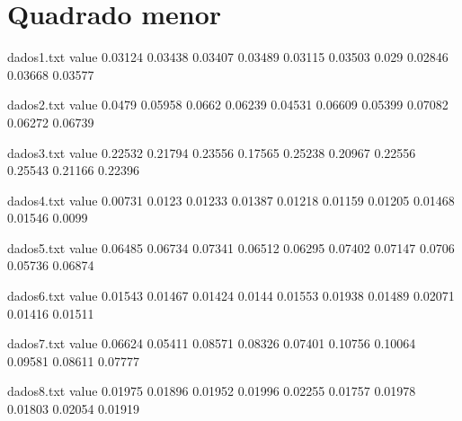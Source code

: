 \documentclass[acronym, symbols, table]{fei}
\begin{document}
	\section{Quadrado menor}
	
\begin{filecontents*}{dados1.txt}
	value
	0.03124
	0.03438
	0.03407
	0.03489
	0.03115
	0.03503
	0.029
	0.02846
	0.03668
	0.03577
\end{filecontents*}

\begin{filecontents*}{dados2.txt}
	value
	0.0479
	0.05958
	0.0662
	0.06239
	0.04531
	0.06609
	0.05399
	0.07082
	0.06272
	0.06739
\end{filecontents*}

\begin{filecontents*}{dados3.txt}
	value
	0.22532
	0.21794
	0.23556
	0.17565
	0.25238
	0.20967
	0.22556
	0.25543
	0.21166
	0.22396
\end{filecontents*}

\begin{filecontents*}{dados4.txt}
	value
	0.00731
	0.0123
	0.01233
	0.01387
	0.01218
	0.01159
	0.01205
	0.01468
	0.01546
	0.0099
\end{filecontents*}

\begin{filecontents*}{dados5.txt}
	value
	0.06485
	0.06734
	0.07341
	0.06512
	0.06295
	0.07402
	0.07147
	0.0706
	0.05736
	0.06874
\end{filecontents*}

\begin{filecontents*}{dados6.txt}
	value
	0.01543
	0.01467
	0.01424
	0.0144
	0.01553
	0.01938
	0.01489
	0.02071
	0.01416
	0.01511
\end{filecontents*}

\begin{filecontents*}{dados7.txt}
	value
	0.06624
	0.05411
	0.08571
	0.08326
	0.07401
	0.10756
	0.10064
	0.09581
	0.08611
	0.07777
\end{filecontents*}

\begin{filecontents*}{dados8.txt}
	value
	0.01975
	0.01896
	0.01952
	0.01996
	0.02255
	0.01757
	0.01978
	0.01803
	0.02054
	0.01919
\end{filecontents*}
	
\end{document}
